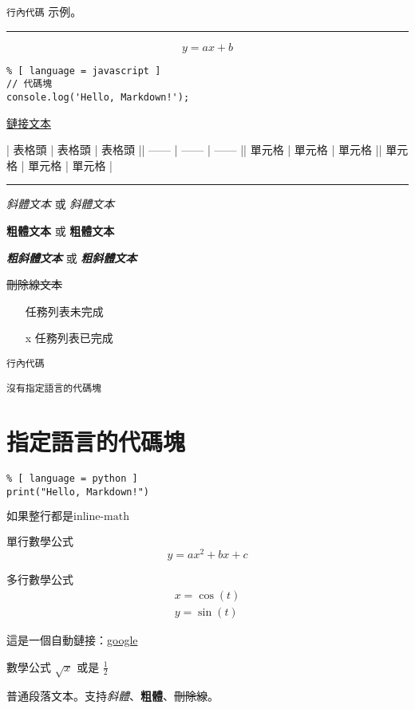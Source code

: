 \documentclass[12pt]{article}
\begin{document}
\lstinline{行內代碼} 示例。

\vspace{5pt}
\hrule
\vspace{6pt}


\begin{equation}
y = ax+b
\end{equation}


\begin{lstlisting}% [ language = javascript ]
// 代碼塊
console.log('Hello, Markdown!');
\end{lstlisting}

\href{http://example.com}{鏈接文本}

| 表格頭 | 表格頭 | 表格頭 || ------ | ------ | ------ || 單元格 | 單元格 | 單元格 || 單元格 | 單元格 | 單元格 |

\vspace{5pt}
\hrule
\vspace{6pt}

\textit{斜體文本} 或 \textit{斜體文本}

\textbf{粗體文本} 或 \textbf{粗體文本}

\textbf{\textit{粗斜體文本}} 或 \textbf{\textit{粗斜體文本}}

\sout{刪除線文本}

\begin{itemize}
	\item [ ] 任務列表未完成
	\item [x] 任務列表已完成

\end{itemize}
\lstinline{行內代碼}


\begin{lstlisting}
沒有指定語言的代碼塊
\end{lstlisting}

\section{指定語言的代碼塊}

\begin{lstlisting}% [ language = python ]
print("Hello, Markdown!")
\end{lstlisting}

$\text{如果整行都是inline-math}$

單行數學公式
\begin{equation}
y = ax^2 + bx + c
\end{equation}


多行數學公式
\begin{equation}
\begin{aligned}
x = \cos(t)\\
y = \sin(t)
\end{aligned}
\end{equation}



這是一個自動鏈接：\href{http://google.com}{google}

數學公式 $\sqrt{x}$ 或是 $\frac{1}{2}$

普通段落文本。支持\textit{斜體}、\textbf{粗體}、\sout{刪除線}。




\end{document}
